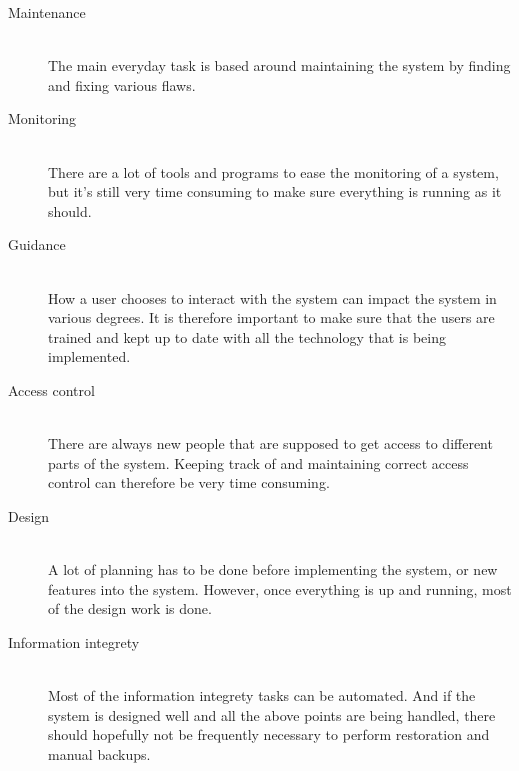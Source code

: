 \begin{description}
  \item[Maintenance] \hfill \\
  The main everyday task is based around maintaining the system by finding and fixing various flaws. 
  \item[Monitoring] \hfill \\
  There are a lot of tools and programs to ease the monitoring of a system, but it's still very time consuming to make sure everything is running as it should.
  \item[Guidance] \hfill \\
  How a user chooses to interact with the system can impact the system in various degrees. It is therefore important to make sure that the users are trained and kept up to date with all the technology that is being implemented.
  \item[Access control] \hfill \\
  There are always new people that are supposed to get access to different parts of the system. Keeping track of and maintaining correct access control can therefore be very time consuming.
  \item[Design] \hfill \\
  A lot of planning has to be done before implementing the system, or new features into the system. However, once everything is up and running, most of the design work is done.
  \item[Information integrety] \hfill \\
  Most of the information integrety tasks can be automated. And if the system is designed well and all the above points are being handled, there should hopefully not be frequently necessary to perform restoration and manual backups.
\end{description}

